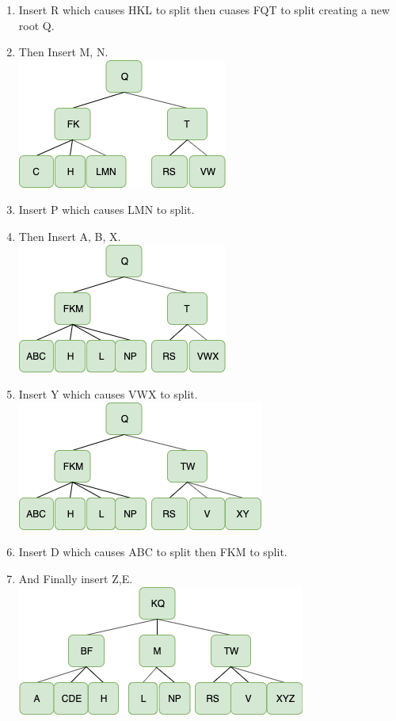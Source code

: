 \documentclass{article}
\begin{document}
\begin{enumerate}
\begin{enumerate}
      \item Insert R which causes HKL to split then cuases FQT to split creating a new root Q.
      \item Then Insert M, N.\\
      \includegraphics[scale=0.5]{10e.png}
      \item Insert P which causes LMN to split.
      \item Then Insert A, B, X.\\
      \includegraphics[scale=0.5]{10f.png}
      \item Insert Y which causes VWX to split.\\
      \includegraphics[scale=0.5]{10g.png}
      \item Insert D which causes ABC to split then FKM to split.
      \item And Finally insert Z,E.\\
      \includegraphics[scale=0.5]{10h.png}
    \end{enumerate}


\end{enumerate}
\end{document}
